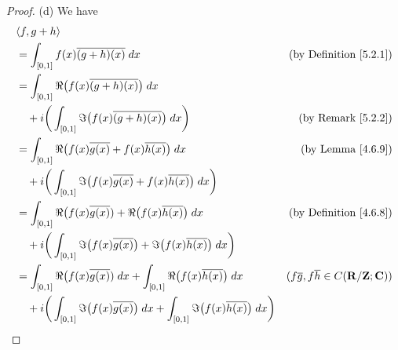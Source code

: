 \begin{proof}{(d)}
    We have
    \begin{align*}
         & \inner*{f, g + h}                                                                                                                                                                                                  \\
         & = \int_{[0, 1]} f(x) \overline{(g + h)(x)} \; dx                                                                                    & \text{(by Definition \ref{5.2.1})}                                           \\
         & = \int_{[0, 1]} \Re\big(f(x) \overline{(g + h)(x)}\big) \; dx                                                                                                                                                      \\
         & \quad + i \bigg(\int_{[0, 1]} \Im\big(f(x) \overline{(g + h)(x)}\big) \; dx\bigg)                                                   & \text{(by Remark \ref{5.2.2})}                                               \\
         & = \int_{[0, 1]} \Re\big(f(x) \overline{g(x)} + f(x) \overline{h(x)}\big) \; dx                                                      & \text{(by Lemma \ref{4.6.9})}                                                \\
         & \quad + i \bigg(\int_{[0, 1]} \Im\big(f(x) \overline{g(x)} + f(x) \overline{h(x)}\big) \; dx\bigg)                                                                                                                 \\
         & = \int_{[0, 1]} \Re\big(f(x) \overline{g(x)}) + \Re\big(f(x) \overline{h(x)}\big) \; dx                                             & \text{(by Definition \ref{4.6.8})}                                           \\
         & \quad + i \bigg(\int_{[0, 1]} \Im\big(f(x) \overline{g(x)}\big) + \Im\big(f(x) \overline{h(x)}\big) \; dx\bigg)                                                                                                    \\
         & = \int_{[0, 1]} \Re\big(f(x) \overline{g(x)}) \; dx + \int_{[0, 1]} \Re\big(f(x) \overline{h(x)}\big) \; dx                         & (f \overline{g}, f \overline{h} \in C(\mathbf{R} / \mathbf{Z} ; \mathbf{C})) \\
         & \quad + i \bigg(\int_{[0, 1]} \Im\big(f(x) \overline{g(x)}\big) \; dx + \int_{[0, 1]} \Im\big(f(x) \overline{h(x)}\big) \; dx\bigg)                                                                                \\

\end{align*}
\end{proof}
